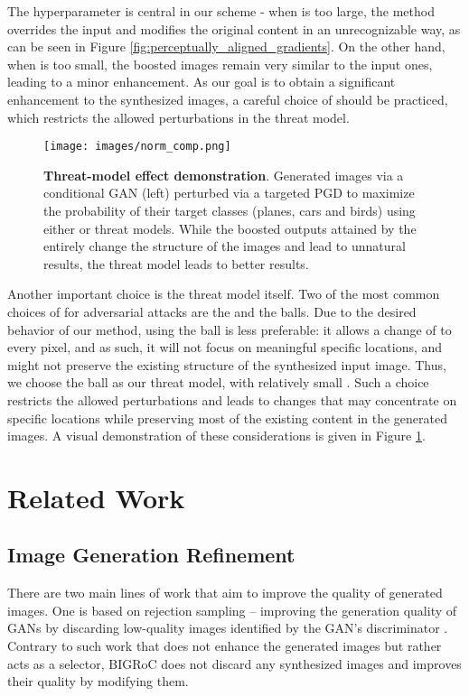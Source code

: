 \documentclass[10pt]{article} \usepackage[accepted]{tmlr}
\begin{document}
The hyperparameter  is central in our scheme - when  is too large, the method overrides the input and modifies the original content in an unrecognizable way, as can be seen in Figure \ref{fig:perceptually_aligned_gradients}.
On the other hand, when  is too small, the boosted images remain very similar to the input ones, leading to a minor enhancement.
As our goal is to obtain a significant enhancement to the synthesized images, a careful choice of  should be practiced, which restricts the allowed perturbations in the threat model.

\begin{figure}[t]
\centering
    \texttt{[image: images/norm\_comp.png]}
    \caption{\textbf{Threat-model effect demonstration}. Generated images via a conditional GAN (left) perturbed via a targeted PGD to maximize the probability of their target classes (\textsf{planes}, \textsf{cars} and \textsf{birds}) using either  or  threat models.
    While the boosted outputs attained by the  entirely change the structure of the images and lead to unnatural results, the  threat model leads to better results.
    }
    \label{fig:attack_norm}
\end{figure}

Another important choice is the threat model  itself.
Two of the most common choices of  for adversarial attacks are the  and the  balls.
Due to the desired behavior of our method, using the  ball is less preferable: it allows a change of  to every pixel, and as such, it will not focus on meaningful specific locations, and might not preserve the existing structure of the synthesized input image.
Thus, we choose the  ball as our threat model, with relatively small . 
Such a choice restricts the allowed perturbations and leads to changes that may concentrate on specific locations while preserving most of the existing content in the generated images.
A visual demonstration of these considerations is given in Figure \ref{fig:attack_norm}.


\section{Related Work}
\label{sec:related_work}

\subsection{Image Generation Refinement}
There are two main lines of work that aim to improve the quality of generated images.
One is based on rejection sampling -- improving the generation quality of GANs by discarding low-quality images identified by the GAN's discriminator \citep{turner2019metropolishastings, azadi2019discriminator}. Contrary to such work that does not enhance the generated images but rather acts as a selector, BIGRoC does not discard any synthesized images and improves their quality by modifying them.
\end{document}
